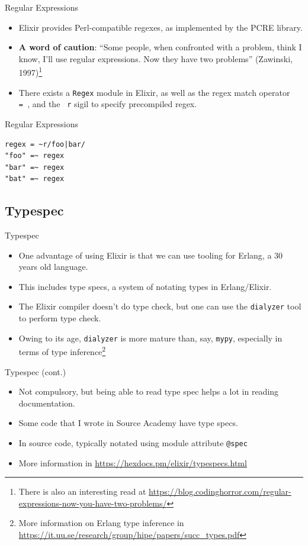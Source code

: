 \documentclass[12pt]{beamer}
\begin{document}
\begin{frame}[fragile]{Regular Expressions}
  \begin{itemize}
    \item Elixir provides Perl-compatible regexes, as implemented by the PCRE library.
    \item \textbf{A word of caution}: ``Some people, when confronted with a problem, think I know, I'll use regular expressions. Now they have two problems'' (Zawinski, 1997)\footnote{There is also an interesting read at \url{https://blog.codinghorror.com/regular-expressions-now-you-have-two-problems/}}
    \item There exists a \texttt{Regex} module in Elixir, as well as the regex match operator \texttt{=~}, and the \texttt{~r} sigil to specify precompiled regex.
  \end{itemize}
\end{frame}

\begin{frame}[fragile]{Regular Expressions}
  \begin{verbatim}
regex = ~r/foo|bar/
"foo" =~ regex
"bar" =~ regex
"bat" =~ regex
  \end{verbatim}
\end{frame}

\subsection{Typespec}
\begin{frame}{Typespec}
  \begin{itemize}
    \item One advantage of using Elixir is that we can use tooling for Erlang, a 30 years old language.
    \item This includes type specs, a system of notating types in Erlang/Elixir.
    \item The Elixir compiler doesn't do type check, but one can use the \texttt{dialyzer} tool to perform type check.
    \item Owing to its age, \texttt{dialyzer} is more mature than, say, \texttt{mypy}, especially in terms of type inference\footnote{More information on Erlang type inference in \url{https://it.uu.se/research/group/hipe/papers/succ_types.pdf}}
  \end{itemize}
\end{frame}

\begin{frame}{Typespec (cont.)}
  \begin{itemize}
    \item Not compulsory, but being able to read type spec helps a lot in reading documentation.
    \item Some code that I wrote in Source Academy have type specs.
    \item In source code, typically notated using module attribute \texttt{@spec}
    \item More information in \url{https://hexdocs.pm/elixir/typespecs.html}
  \end{itemize}
\end{frame}
\end{document}
